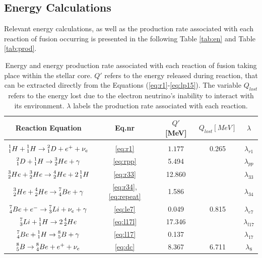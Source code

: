 \documentclass[10pt, nofootinbib, twocolumn]{revtex4-1}
\begin{document}
\newpage
\subsection{Energy Calculations}
Relevant energy calculations, as well as the production rate associated with each reaction of fusion occurring is presented in the following Table \ref{tab:en} and Table \ref{tab:prod}.


\begin{table}[H]
\caption{Energy and energy production rate associated with each reaction of fusion taking place within the stellar core. $Q'$ refers to the energy released during reaction, that can be extracted directly from the Equations (\eqref{eq:r1}-\eqref{eq:lp15}). The variable $Q_{lost}$ refers to the energy lost due to the electron neutrino's inability to interact with its environment. $\lambda$ labels the production rate associated with each reaction.}
    \begin{tabular*}{0.5\textwidth}{@{\extracolsep{\fill}}ccccc}
    \toprule
    \textbf{Reaction Equation} & \textbf{Eq.nr} & \textbf{$Q'$ [MeV]} & \textbf{$Q_{lost}[MeV]$} & \textbf{$\lambda$}\\
    \midrule
    \hline \\
    $\prescript{1}{1}H+\prescript{1}{1}H\rightarrow \prescript{2}{1}D+e^++\nu_e$ &  \eqref{eq:r1} & $1.177$ & 0.265 & $\lambda_{r1}$ \\
     $\prescript{2}{1}D+\prescript{1}{1}H\rightarrow\prescript{3}{2}He+\gamma$ & \eqref{eq:rpp} & 5.494 & &$\lambda_{pp}$  \\
     $\prescript{3}{2}He+\prescript{3}{2}He\rightarrow\prescript{4}{2}He+2\prescript{1}{1}H$ & \eqref{eq:r33} & 12.860 &  &$\lambda_{33}$ \\
     $\prescript{3}{2}He+\prescript{4}{2}He\rightarrow\prescript{7}{4}Be+\gamma$& \eqref{eq:r34},\eqref{eq:repeat} &1.586& & $\lambda_{34}$\\
     $\prescript{7}{4}Be+e^-\rightarrow \prescript{7}{3}Li+\nu_e+\gamma$& \eqref{eq:le7}&0.049& 0.815& $\lambda_{e7}$ \\
     $\prescript{7}{3}Li+\prescript{1}{1}H \rightarrow 2\prescript{4}{2}He$& \eqref{eq:l17l} &17.346& &$\lambda_{l17}$\\
     $\prescript{7}{4}Be+\prescript{1}{1}H \rightarrow \prescript{8}{5}B+\gamma$& \eqref{eq:l17} &0.137& &$\lambda_{17}$\\
     $\prescript{8}{5}B  \rightarrow \prescript{8}{4}Be+e^++\nu_e$& \eqref{eq:dc} &8.367& 6.711&$\lambda_{8}$\\

\end{tabular*}
\end{table}
\end{document}
